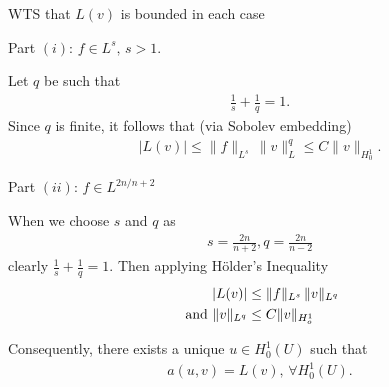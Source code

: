 \documentclass[12pt,a4paper]{report}
\begin{document}
\begin{description}
\item WTS that $L(v)$ is bounded in each case \begin{description}

	\item Part $(i)$: $f\in L^s,\, s>1$.

	Let $q$ be such that 
	\begin{align*}
		\frac{1}{s}+\frac{1}{q}=1.
	\end{align*}Since $q$ is finite, it follows that (via Sobolev embedding)
	\begin{align*}
		|L(v)| \le \|f\|_{L^s}\,\|v\|_L^q \le C\|v\|_{H_0^1}.
	\end{align*}

	\item Part $(ii)$: $f \in L^{2n/n+2}$
	
	When we choose $s$ and $q$ as
	\begin{align*}
		s = \frac{2n}{n+2}, q = \frac{2n}{n-2} 
	\end{align*}clearly $\frac{1}{s}+\frac{1}{q} = 1$.  Then applying H\"older's Inequality
	\begin{align*}
		|L(v)| &\le \|f\|_{L^s}\,\|v\|_{L^q} \\
		\text{ and } \|v\|_{L^q} &\le C\|v\|_{H_o^1}
	\end{align*}

\end{description}

\item Consequently, there exists a unique $u \in H_0^1(U)$ such that 
	\begin{align*}
		a(u,v) = L(v),\, \forall H_0^1(U).
	\end{align*}


\end{description}
\end{document}
